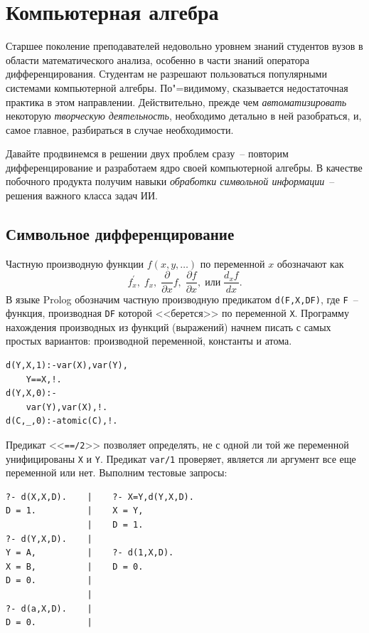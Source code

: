 \documentclass[a4paper,14pt, openany, twoside, final]{extbook} %
\begin{document}
\chapter{Компьютерная алгебра}
\label{cha:compalgebra}

Старшее поколение преподавателей недовольно уровнем знаний студентов вузов в области математического анализа, особенно в части знаний оператора дифференцирования.  Студентам не разрешают пользоваться популярными системами компьютерной алгебры.  По"=видимому, сказывается недостаточная практика в этом направлении.  Действительно, прежде чем \emph{автоматизировать} некоторую \emph{творческую деятельность}, необходимо детально в ней разобраться, и, самое главное, разбираться в случае необходимости.

Давайте продвинемся в решении двух проблем сразу~-- повторим дифференцирование и разработаем ядро своей компьютерной алгебры.  В качестве побочного продукта получим навыки \emph{обработки символьной информации}~-- решения важного класса задач ИИ.

\section{Символьное дифференцирование}
\label{sec:}


Частную производную функции $f(x,y,\ldots)$ по переменной $x$ обозначают как
$$
f^{\prime}_x,\;f_x,\;\frac{\partial }{\partial x}f,\;\frac{\partial f}{\partial x}, \;\mbox{или}\; \frac{d_x f}{dx}.
$$
В языке Prolog обозначим частную производную предикатом \texttt{d(F,X,DF)}, где \texttt{F}~-- функция, производная \texttt{DF} которой <<берется>> по переменной \texttt{X}.  Программу нахождения производных из функций (выражений) начнем писать с самых простых вариантов: производной переменной, константы и атома.

\begin{verbatim}
d(Y,X,1):-var(X),var(Y),
    Y==X,!.
d(Y,X,0):-
    var(Y),var(X),!.
d(C,_,0):-atomic(C),!.
\end{verbatim}

Предикат <<\texttt{==/2}>> позволяет определять, не с одной ли той же переменной унифицированы \texttt{X} и \texttt{Y}.  Предикат \texttt{var/1} проверяет, является ли аргумент все еще переменной или нет.  Выполним тестовые запросы:

\begin{verbatim}
?- d(X,X,D).    |    ?- X=Y,d(Y,X,D).
D = 1.          |    X = Y,
                |    D = 1.
?- d(Y,X,D).    |
Y = A,          |    ?- d(1,X,D).
X = B,          |    D = 0.
D = 0.          |
                |
?- d(a,X,D).    |
D = 0.          |
\end{verbatim}
\end{document}
